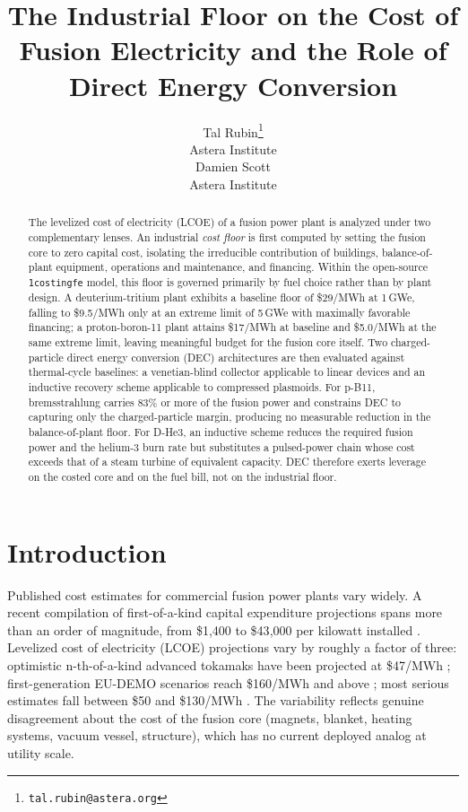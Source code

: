 \documentclass{article}
\title{The Industrial Floor on the Cost of Fusion Electricity and the
Role of Direct Energy Conversion}
\author{%
        Tal Rubin\thanks{\texttt{tal.rubin@astera.org}} \\
        Astera Institute \\
        \And
        Damien Scott \\
        Astera Institute
}
\begin{document}
\maketitle

\begin{abstract}
The levelized cost of electricity (LCOE) of a fusion power plant is
analyzed under two complementary lenses. An industrial \emph{cost
floor} is first computed by setting the fusion core to zero capital
cost, isolating the irreducible contribution of buildings,
balance-of-plant equipment, operations and maintenance, and financing.
Within the open-source \texttt{1costingfe} model, this floor is
governed primarily by fuel choice rather than by plant design. A
deuterium-tritium plant exhibits a baseline floor of \$29/MWh at
1\,GWe, falling to \$9.5/MWh only at an extreme limit of 5\,GWe
with maximally favorable financing; a proton-boron-11 plant
attains \$17/MWh at baseline and \$5.0/MWh at the same extreme
limit, leaving meaningful budget for the fusion core itself. Two
charged-particle direct energy conversion (DEC) architectures are
then evaluated against thermal-cycle baselines: a venetian-blind
collector applicable to linear devices and an inductive recovery
scheme applicable to compressed plasmoids. For p-B11, bremsstrahlung
carries 83\% or more of the fusion power and constrains DEC to capturing only
the charged-particle margin, producing no measurable reduction in the
balance-of-plant floor. For D-He3, an inductive scheme reduces the
required fusion power and the helium-3 burn rate but substitutes a
pulsed-power chain whose cost exceeds that of a steam turbine of
equivalent capacity. DEC therefore exerts leverage on the costed core
and on the fuel bill, not on the industrial floor.
\end{abstract}


\section{Introduction}
\label{sec:intro}

Published cost estimates for commercial fusion power plants vary
widely. A recent compilation of first-of-a-kind capital expenditure
projections spans more than an order of magnitude, from \$1{,}400
to \$43{,}000 per kilowatt installed \citep{Tang2026}. Levelized
cost of electricity (LCOE) projections vary by roughly a factor of
three: optimistic n-th-of-a-kind advanced tokamaks have been
projected at \$47/MWh \citep{Najmabadi2006}; first-generation
EU-DEMO scenarios reach \$160/MWh and above \citep{Entler2018};
most serious estimates fall between \$50 and \$130/MWh
\citep{SheffieldMilora2016, Lindley2023}. The variability reflects genuine
disagreement about the cost of the fusion core (magnets, blanket,
heating systems, vacuum vessel, structure), which has no current
deployed analog at utility scale.
\end{document}
